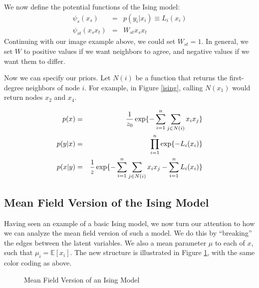 \documentclass[twoside]{article}
\begin{document}
We now define the potential functions of the Ising model:
\begin{eqnarray*}
\psi_s(x_s) &=& p(y_i | x_i) \equiv L_i(x_i) \\
\psi_{st} (x_s x_t) &=& W_{st} x_s x_t 
\end{eqnarray*} 
Continuing with our image example above, we could set $W_{st}=1$. In general, we set $W$ to positive values if we want neighbors to agree, and negative values if we want them to differ. 

Now we can specify our priors. Let $N(i)$ be a function that returns the first-degree neighbors of node $i$. For example, in Figure \ref{ising}, calling $N(x_1)$ would return nodes $x_2$ and $x_4$.

\begin{eqnarray*}
p(x) &=& {1 \over z_0} \exp\{ - \sum_{i=1}^n \sum_{j \in N(i)} x_i x_j \} \\
p(y|x) &=& \prod_{i=1}^n \exp \{-L_i(x_i) \} \\
p(x|y) &=& {1 \over z} \exp \{ - \sum_{i=1}^n  \sum_{j \in N(i)} x_i x_j - \sum_{i=1}^n L_i(x_i) \}
\end{eqnarray*}

\subsection{Mean Field Version of the Ising Model}

Having seen an example of a basic Ising model, we now turn our attention to how we can analyze the mean field version of such a model. We do this by ``breaking'' the edges between the latent variables. We also a mean parameter $\mu$ to each of $x$, such that $\mu_i=\mathbb{E}[x_i]$. The new structure is illustrated in Figure \ref{meanfield}, with the same color coding as above. 

\begin{figure}[h!]
\begin{center}
\end{center}
\caption{Mean Field Version of an Ising Model}
\label{meanfield}
\end{figure}
\end{document}
